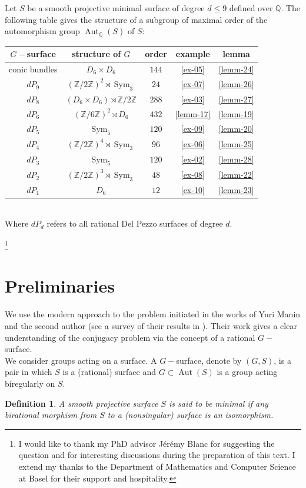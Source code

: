 \documentclass[leqno,12pt]{amsart} %
\newtheorem{defi}[thm]{Definition}
\newcommand{\Z}{\ensuremath{\mathbb{Z}}}
\newcommand{\Q}{\ensuremath{\mathbb{Q} }}
\DeclareMathOperator{\Aut}{Aut}
\DeclareMathOperator{\sym}{Sym}
\begin{document}
Let $S$ be a smooth projective minimal surface of degree $d\le 9$ defined over $\Q$. The following table gives the structure of a subgroup of maximal order of the automorphism group $\Aut_{\Q}(S)$ of $S$:
\begin{table}[h!]
    \centering
    \begin{tabular}{| c| c| c| c|c|}
    \hline
$G-$surface &structure of $G$& order & example & lemma\\
      \hline
 conic bundles &  $D_6\times D_6$   & $144$ &\ref{ex-05}&\ref{lemm-24}\\ 
      \hline
      $dP_9$ &$(\Z/2\Z)^2\rtimes\sym_3$ &$24$& \ref{ex-07}&\ref{lemm-26}\\  
  \hline
$dP_8$ &$(D_6\times D_6)\rtimes\Z/2\Z$ &$288$& \ref{ex-03}&\ref{lemm-27}\\  
  \hline
$dP_6$& $(\Z/6\Z)^2\rtimes D_6$    &$432$&\ref{lemm-17}&\ref{lemm-19}\\  
\hline
$dP_5$&  $ \sym_5$ &$120$& \ref{ex-09}&\ref{lemm-20}\\ 
\hline
$dP_4$ & $(\Z/2\Z)^4\rtimes \sym_3$ &$96$&\ref{ex-06}&\ref{lemm-25}\\ 
\hline
$dP_3$&$\sym_5$  &$120$&\ref{ex-02}&\ref{lemm-28}\\ 
\hline
$dP_2$ &$(\Z /2\Z )^3\rtimes\sym_3$   &$48$&\ref{ex-08}&\ref{lemm-22}\\
\hline
$dP_1$ & $D_6$   &$12$&\ref{ex-10}&\ref{lemm-23}\\
\hline
    \end{tabular}
    \label{Table:-32}
\end{table}\\
Where $dP_d$ refers to all rational Del Pezzo surfaces of degree $d$. \bigskip

\thanks{I would like to thank my PhD advisor Jérémy Blanc for suggesting the question and for interesting discussions during the preparation of this text. I extend my thanks to the Department of Mathematics and Computer Science at Basel for their support and hospitality.}
\section{Preliminaries}
We use the modern approach to the problem initiated in the works of Yuri Manin and the second author (see a survey of their results in \cite{MR1422227}). Their work gives a clear understanding of the conjugacy problem via the concept of a rational $G-$surface.\\[2mm]
 We consider groups acting on a surface. A $G-$surface, denote by $(G, S)$, is a pair in which $S$ is a (rational) surface and $G \subset \Aut(S)$ is a group acting biregularly on $S$.
  \begin{defi}
  A smooth projective surface $S$ is said to be minimal if any birational morphism from $S$ to a (nonsingular) surface is an isomorphism.
\end{defi}
 
\end{document}
